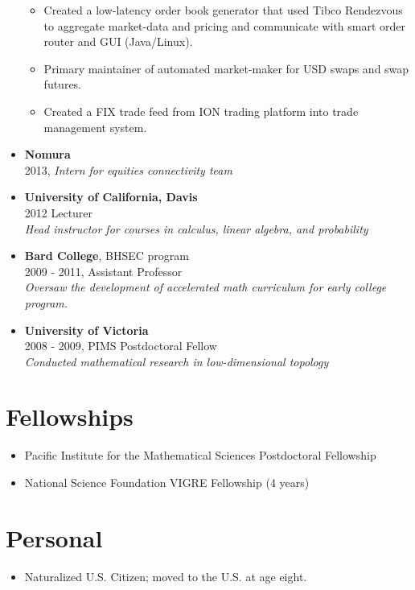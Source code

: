 \documentclass[margin]{res}
\def\tightlist{}
\begin{document}
\begin{resume}
\begin{itemize}
  \begin{itemize}
  \tightlist
  \item
    Created a low-latency order book generator that used Tibco
    Rendezvous to aggregate market-data and pricing and communicate with
    smart order router and GUI (Java/Linux).
  \item
    Primary maintainer of automated market-maker for USD swaps and swap
    futures.
  \item
    Created a FIX trade feed from ION trading platform into trade
    management system.
  \end{itemize}
\item
  \textbf{Nomura}\\
  2013, \emph{Intern for equities connectivity team}
\item
  \textbf{University of California, Davis}\\
  2012 Lecturer\\
  \emph{Head instructor for courses in calculus, linear algebra, and
  probability}
\item
  \textbf{Bard College}, BHSEC program\\
  2009 - 2011, Assistant Professor\\
  \emph{Oversaw the development of accelerated math curriculum for early
  college program.}
\item
  \textbf{University of Victoria}\\
  2008 - 2009, PIMS Postdoctoral Fellow\\
  \emph{Conducted mathematical research in low-dimensional topology}
\end{itemize}

\hypertarget{fellowships}{%
\section{Fellowships}\label{fellowships}}

\begin{itemize}
\tightlist
\item
  Pacific Institute for the Mathematical Sciences Postdoctoral
  Fellowship
\item
  National Science Foundation VIGRE Fellowship (4 years)
\end{itemize}

\hypertarget{personal}{%
\section{Personal}\label{personal}}

\begin{itemize}
\tightlist
\item
  Naturalized U.S. Citizen; moved to the U.S. at age eight.
\end{itemize}

\end{resume}
\end{document}

